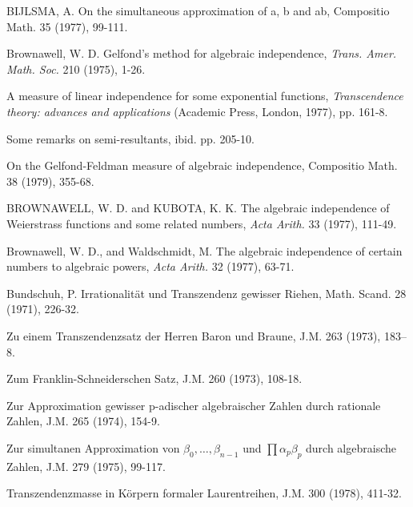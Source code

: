 \begin{hanglist}
    \item BIJLSMA, A. On the simultaneous approximation of a, b and ab, Compositio Math. 35 (1977), 99-111.
    \item Brownawell, W. D. Gelfond's method for algebraic independence, \textit{Trans. Amer. Math. Soc.} 210 (1975), 1-26.
    \item \hspace{1.5em} A measure of linear independence for some exponential functions, \textit{Transcendence theory: advances and applications} (Academic Press, London, 1977), pp. 161-8.
    \item \hspace{1.5em} Some remarks on semi-resultants, ibid. pp. 205-10.
    \item \hspace{1.5em} On the Gelfond-Feldman measure of algebraic independence, Compositio Math. 38 (1979), 355-68.
    \item BROWNAWELL, W. D. and KUBOTA, K. K. The algebraic independence of Weierstrass functions and some related numbers, \textit{Acta Arith.} 33 (1977), 111-49.
    \item Brownawell, W. D., and Waldschmidt, M. The algebraic independence of certain numbers to algebraic powers, \textit{Acta Arith.} 32 (1977), 63-71.
    \item Bundschuh, P. Irrationalität und Transzendenz gewisser Riehen, Math. Scand. 28 (1971), 226-32.
    \item \hspace{1.5em} Zu einem Transzendenzsatz der Herren Baron und Braune, J.M. 263 (1973), 183–8.
    \item \hspace{1.5em} Zum Franklin-Schneiderschen Satz, J.M. 260 (1973), 108-18.
    \item \hspace{1.5em} Zur Approximation gewisser p-adischer algebraischer Zahlen durch rationale Zahlen, J.M. 265 (1974), 154-9.
    \item \hspace{1.5em} Zur simultanen Approximation von  $\beta_0, \ldots, \beta_{n-1}$  und  $\prod \alpha_p \beta_p$  durch algebraische Zahlen, J.M. 279 (1975), 99-117.
    \item \hspace{1.5em} Transzendenzmasse in Körpern formaler Laurentreihen, J.M. 300 (1978), 411-32.

\end{hanglist}

